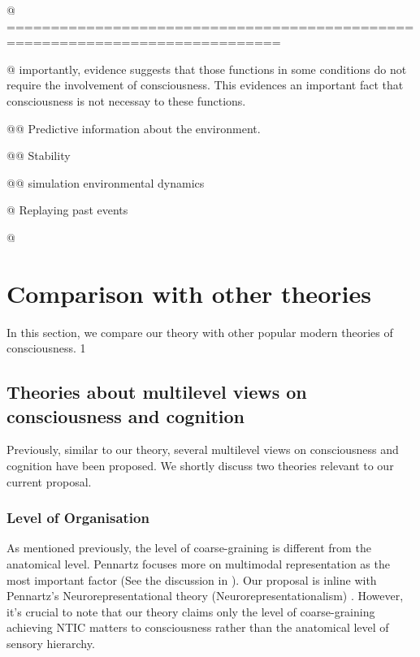 \documentclass[utf8]{article}
\begin{document}
\begin{WritingMaterials}
            @ =============================================================================
            
	        @ importantly, evidence suggests that those functions in some conditions do not require the involvement of consciousness. This evidences an important fact that consciousness is not necessay to these functions. 
	        
	        
	        @@ Predictive information about the environment.
	        
	        @@ Stability 
	        
	        @@ simulation environmental dynamics 
	        
	        @ Replaying past events
	        
	        @  \cite{van2012role}
	        
	    \end{WritingMaterials}
	    


	\section{Comparison with other theories}
	In this section, we compare our theory with other popular modern theories of consciousness. 1

		\subsection{Theories about multilevel views on consciousness and cognition}
		Previously, similar to our theory, several multilevel views on consciousness and cognition have been proposed. We shortly discuss two theories relevant to our current proposal.
            \subsubsection*{Level of Organisation \cite{wimsatt1994ontology}}
                As mentioned previously, the level of coarse-graining is different from the anatomical level.
                Pennartz focuses more on multimodal representation as the most important factor (See the discussion in \cite{pennartz2015brain}). Our proposal is inline with Pennartz's Neurorepresentational  theory (Neurorepresentationalism) \cite{pennartz2018consciousness,pennartz2015brain}. However, it’s crucial to note that our theory claims only the level of coarse-graining achieving NTIC matters to consciousness rather than the anatomical level of sensory hierarchy. 
\end{document}
